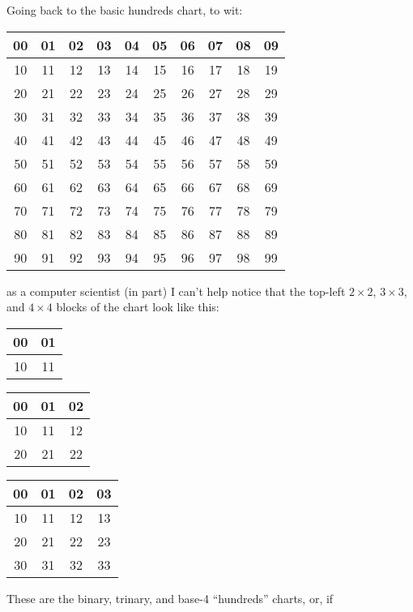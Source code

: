 \documentclass[12pt]{article}
\newcommand{\tablesize}{\footnotesize\sffamily}
\begin{document}
Going back to the basic hundreds chart, to wit:
\begin{center}\tablesize
\begin{tabular}{|c|c|c|c|c|c|c|c|c|c|}
\hline
 00 & 01 & 02 & 03 & 04 & 05 & 06 & 07 & 08 & 09 \\ \hline
 10 & 11 & 12 & 13 & 14 & 15 & 16 & 17 & 18 & 19 \\ \hline
 20 & 21 & 22 & 23 & 24 & 25 & 26 & 27 & 28 & 29 \\ \hline
 30 & 31 & 32 & 33 & 34 & 35 & 36 & 37 & 38 & 39 \\ \hline
 40 & 41 & 42 & 43 & 44 & 45 & 46 & 47 & 48 & 49 \\ \hline
 50 & 51 & 52 & 53 & 54 & 55 & 56 & 57 & 58 & 59 \\ \hline
 60 & 61 & 62 & 63 & 64 & 65 & 66 & 67 & 68 & 69 \\ \hline
 70 & 71 & 72 & 73 & 74 & 75 & 76 & 77 & 78 & 79 \\ \hline
 80 & 81 & 82 & 83 & 84 & 85 & 86 & 87 & 88 & 89 \\ \hline
 90 & 91 & 92 & 93 & 94 & 95 & 96 & 97 & 98 & 99 \\ \hline
\end{tabular}
\end{center}
as a computer scientist (in part) I can't help notice that the
top-left $2\times 2$, $3\times 3$, and $4\times 4$ blocks of the
chart look like this:
\begin{center}\tablesize
\begin{tabular}{|c|c|}
\hline
 00 & 01 \\ \hline
 10 & 11 \\ \hline
\end{tabular}
\quad
\begin{tabular}{|c|c|c|}
\hline
 00 & 01 & 02 \\ \hline
 10 & 11 & 12 \\ \hline
 20 & 21 & 22 \\ \hline
\end{tabular}
\quad
\begin{tabular}{|c|c|c|c|}
\hline
 00 & 01 & 02 & 03 \\ \hline
 10 & 11 & 12 & 13 \\ \hline
 20 & 21 & 22 & 23 \\ \hline
 30 & 31 & 32 & 33 \\ \hline
\end{tabular}
\end{center}
These are the binary, trinary, and base-4 ``hundreds'' charts, or, if
\end{document}
